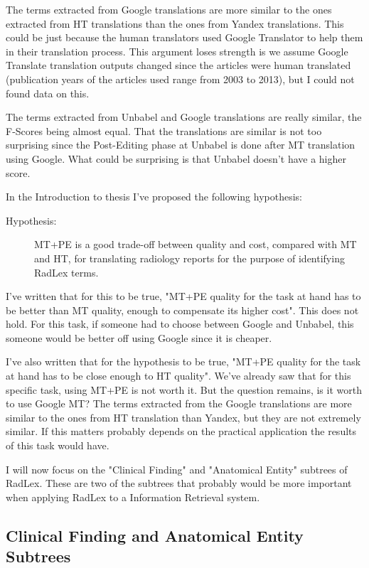 The terms extracted from Google translations are more similar to the ones extracted from HT translations than the ones from Yandex translations. This could be just because the human translators used Google Translator to help them in their translation process. This argument loses strength is we assume Google Translate translation outputs changed since the articles were human translated (publication years of the articles used range from 2003 to 2013), but I could not found  data on this. 

The terms extracted from Unbabel and Google translations are really similar, the F-Scores being almost equal. That the translations are similar is not too surprising since the Post-Editing phase at Unbabel is done after MT translation using Google. What could be surprising is that Unbabel doesn't have a higher score. 

In the Introduction to thesis I've proposed the following hypothesis:

\begin{description}
	\item[Hypothesis:] MT+PE is a good trade-off between quality and cost, compared with MT and HT, for translating radiology reports for the purpose of identifying RadLex terms. 
\end{description}

I've written that for this to be true, "MT+PE quality for the task at hand has to be better than MT quality, enough to compensate its higher cost". This does not hold. For this task, if someone had to choose between Google and Unbabel, this someone would be better off using Google since it is cheaper. 

I've also written that for the hypothesis to be true, "MT+PE quality for the task at hand has to be close enough to HT quality". We've already saw that for this specific task, using MT+PE is not worth it. But the question remains, is it worth to use Google MT? The terms extracted from the Google translations are more similar to the ones from HT translation than Yandex, but they are not extremely similar. If this matters probably depends on the practical application the results of this task would have. 

I will now focus on the "Clinical Finding" and "Anatomical Entity" subtrees of RadLex. These are two of the subtrees that probably would be more important when applying RadLex to a Information Retrieval system. 

\subsection{Clinical Finding and Anatomical Entity Subtrees}


